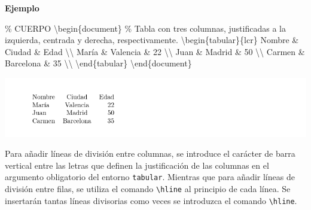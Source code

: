 \documentclass[
  letterpaper,
  DIV=11,
  numbers=noendperiod]{scrreport}
\newenvironment{Shaded}{\begin{snugshade}}{\end{snugshade}}
\newcommand{\CommentTok}[1]{\textcolor[rgb]{0.37,0.37,0.37}{#1}}
\newcommand{\ExtensionTok}[1]{\textcolor[rgb]{0.00,0.23,0.31}{#1}}
\newcommand{\FunctionTok}[1]{\textcolor[rgb]{0.28,0.35,0.67}{#1}}
\newcommand{\KeywordTok}[1]{\textcolor[rgb]{0.00,0.23,0.31}{#1}}
\newcommand{\NormalTok}[1]{\textcolor[rgb]{0.00,0.23,0.31}{#1}}
\newcommand{\OperatorTok}[1]{\textcolor[rgb]{0.37,0.37,0.37}{#1}}
\begin{document}
\textbf{Ejemplo}

\begin{Shaded}
\begin{Highlighting}[]
\CommentTok{\% CUERPO}
\KeywordTok{\textbackslash{}begin}\NormalTok{\{}\ExtensionTok{document}\NormalTok{\}}
\CommentTok{\% Tabla con tres columnas, justificadas a la izquierda, centrada y derecha, respectivamente.}
\KeywordTok{\textbackslash{}begin}\NormalTok{\{}\ExtensionTok{tabular}\NormalTok{\}\{lcr\}}
\NormalTok{Nombre }\OperatorTok{\&}\NormalTok{ Ciudad }\OperatorTok{\&}\NormalTok{ Edad }\FunctionTok{\textbackslash{}\textbackslash{}}
\NormalTok{María }\OperatorTok{\&}\NormalTok{ Valencia }\OperatorTok{\&}\NormalTok{ 22 }\FunctionTok{\textbackslash{}\textbackslash{}}
\NormalTok{Juan }\OperatorTok{\&}\NormalTok{ Madrid }\OperatorTok{\&}\NormalTok{ 50 }\FunctionTok{\textbackslash{}\textbackslash{}}
\NormalTok{Carmen }\OperatorTok{\&}\NormalTok{ Barcelona }\OperatorTok{\&}\NormalTok{ 35 }\FunctionTok{\textbackslash{}\textbackslash{}}
\KeywordTok{\textbackslash{}end}\NormalTok{\{}\ExtensionTok{tabular}\NormalTok{\}}
\KeywordTok{\textbackslash{}end}\NormalTok{\{}\ExtensionTok{document}\NormalTok{\}}
\end{Highlighting}
\end{Shaded}

\begin{tcolorbox}[enhanced jigsaw, opacitybacktitle=0.6, coltitle=black, colbacktitle=quarto-callout-note-color!10!white, title={Salida}, colback=white, toprule=.15mm, breakable, opacityback=0, left=2mm, rightrule=.15mm, toptitle=1mm, colframe=quarto-callout-note-color-frame, bottomtitle=1mm, titlerule=0mm, arc=.35mm, bottomrule=.15mm, leftrule=.75mm]
\includegraphics{./img/tablas/tabla-simple.png}
\end{tcolorbox}

Para añadir líneas de división entre columnas, se introduce el carácter
de barra vertical \texttt{\textbar{}} entre las letras que definen la
justificación de las columnas en el argumento obligatorio del entorno
\texttt{tabular}. Mientras que para añadir líneas de división entre
filas, se utiliza el comando \texttt{\textbackslash{}hline} al principio
de cada línea. Se insertarán tantas líneas divisorias como veces se
introduzca el comando \texttt{\textbackslash{}hline}.
\end{document}
